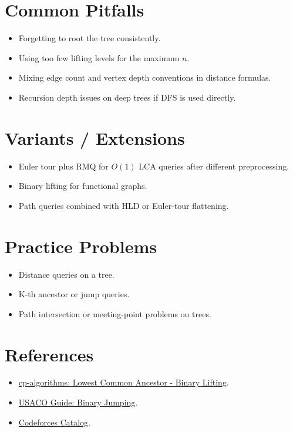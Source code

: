 \section*{Common Pitfalls}

\begin{itemize}
  \item Forgetting to root the tree consistently.
  \item Using too few lifting levels for the maximum \(n\).
  \item Mixing edge count and vertex depth conventions in distance formulas.
  \item Recursion depth issues on deep trees if DFS is used directly.
\end{itemize}

\section*{Variants / Extensions}

\begin{itemize}
  \item Euler tour plus RMQ for \(O(1)\) LCA queries after different preprocessing.
  \item Binary lifting for functional graphs.
  \item Path queries combined with HLD or Euler-tour flattening.
\end{itemize}

\section*{Practice Problems}

\begin{itemize}
  \item Distance queries on a tree.
  \item K-th ancestor or jump queries.
  \item Path intersection or meeting-point problems on trees.
\end{itemize}

\section*{References}

\begin{itemize}
  \item \href{https://cp-algorithms.com/graph/lca_binary_lifting.html}{cp-algorithms: Lowest Common Ancestor - Binary Lifting}.
  \item \href{https://usaco.guide/plat/binary-jump}{USACO Guide: Binary Jumping}.
  \item \href{https://codeforces.com/catalog}{Codeforces Catalog}.
\end{itemize}
